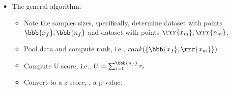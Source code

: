\begin{itemize}
\begin{itemize}
        \begin{itemize}
          \item The general algorithm:
            \begin{itemize}
              \item Note the samples sizes, specifically, determine dataset with  points \(\bbb{x_f}, \bbb{n_f}\) and dataset with  points \(\rrr{x_m}, \rrr{n_m}\).
              \item Pool data and compute rank, i.e., \(rank(\{\bbb{x_f},\rrr{x_m}\})\)
              \item Compute U score, i.e., \(U = \sum_{i = 1}^{\bbb{n_f}}r_i\)
              \item Convert to a \(z\)-score, \hyperref[Subsection: Degrees of Freedom]{}, a p-value.
            \end{itemize}
        \end{itemize}
  \end{itemize}
  

\end{itemize}
